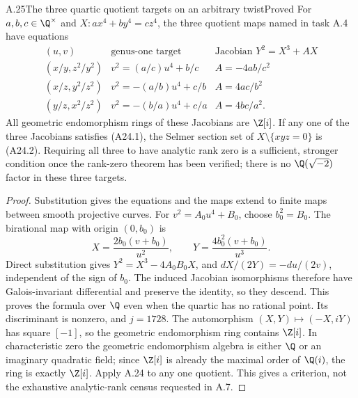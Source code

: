 \begin{statement}{A.25}{The three quartic quotient targets on an arbitrary twist}{Proved}
For $a,b,c\in\Q^\times$ and $X:a x^4+b y^4=c z^4$, the three quotient maps named in task A.4 have equations
\[
\begin{array}{c|c|c}
(u,v)&\text{genus-one target}&\text{Jacobian }Y^2=X^3+AX\\\hline
(x/y,z^2/y^2)&v^2=(a/c)u^4+b/c&A=-4ab/c^2\\
(x/z,y^2/z^2)&v^2=-(a/b)u^4+c/b&A=4ac/b^2\\
(y/z,x^2/z^2)&v^2=-(b/a)u^4+c/a&A=4bc/a^2.
\end{array}
\tag{A25.1}
\]
All geometric endomorphism rings of these Jacobians are $\Z[i]$. If any one of the three Jacobians satisfies (A24.1), the Selmer section set of $X\setminus\{xyz=0\}$ is (A24.2). Requiring all three to have analytic rank zero is a sufficient, stronger condition once the rank-zero theorem has been verified; there is no $\Q(\sqrt{-2})$ factor in these three targets.
\end{statement}
\begin{proof}
Substitution gives the equations and the maps extend to finite maps between smooth projective curves. For $v^2=A_0u^4+B_0$, choose $b_0^2=B_0$. The birational map with origin $(0,b_0)$ is
\[
X=\frac{2b_0(v+b_0)}{u^2},\qquad Y=\frac{4b_0^2(v+b_0)}{u^3}.
\]
Direct substitution gives $Y^2=X^3-4A_0B_0X$, and $dX/(2Y)=-du/(2v)$, independent of the sign of $b_0$. The induced Jacobian isomorphisms therefore have Galois-invariant differential and preserve the identity, so they descend. This proves the formula over $\Q$ even when the quartic has no rational point. Its discriminant is nonzero, and $j=1728$. The automorphism $(X,Y)\mapsto(-X,iY)$ has square $[-1]$, so the geometric endomorphism ring contains $\Z[i]$. In characteristic zero the geometric endomorphism algebra is either $\Q$ or an imaginary quadratic field; since $\Z[i]$ is already the maximal order of $\Q(i)$, the ring is exactly $\Z[i]$. Apply A.24 to any one quotient. This gives a criterion, not the exhaustive analytic-rank census requested in A.7.
\end{proof}

